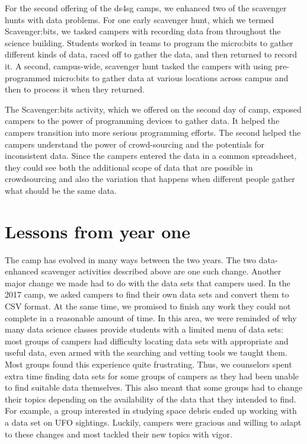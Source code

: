 For the second offering of the ds4sg camps, we enhanced two of the
scavenger hunts with data problems.  For one early scavenger hunt,
which we termed Scavenger:bits, we tasked campers with recording
data from throughout the science building.  Students worked in teams
to program the micro:bits to gather different kinds of data, raced
off to gather the data, and then returned to record it.  A second,
campus-wide, scavenger hunt tasked the campers with using
pre-programmed micro:bits to gather data at various locations across
campus and then to process it when they returned.

The Scavenger:bits activity, which we offered on the second
day of camp, exposed campers to the power of programming devices
to gather data.  It helped the campers transition into more serious
programming efforts.  The second helped the campers understand the
power of crowd-sourcing and the potentials for inconsistent data.
Since the campers entered the data in a common spreadsheet, they could
see both the additional scope of data that are possible in crowdsourcing
and also the variation that happens when different people gather
what should be the same data.

\section{Lessons from year one}

The camp has evolved in many ways between the two years.  The two
data-enhanced scavenger activities described above are one such
change.
Another major change we made had to do with the data sets that
campers used.  In the 2017 camp, we asked campers to find their
own data sets and convert them to CSV format.  At the same time,
we promised to finish any work they could not complete in a reasonable
amount of time.  In this area, we were reminded of why many data
science classes provide students with a limited menu of data sets:
most groups of campers had difficulty locating data sets with
appropriate and useful data, even armed with the searching and
vetting tools we taught them.  Most groups found this experience
quite frustrating.  Thus, we counselors spent extra time finding
data sets for some groups of campers as they had been unable to find
suitable data themselves.  This also meant that some groups had to
change their topics depending on the availability of the data that
they intended to find.  For example, a group interested in studying
space debris ended up working with a data set on UFO sightings.
Luckily, campers were gracious and willing to adapt to these changes
and most tackled their new topics with vigor.

